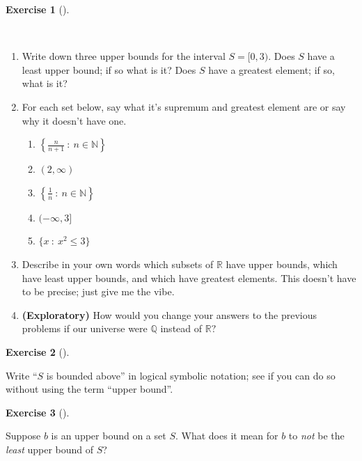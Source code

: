 \documentclass[
  letterpaper,
  DIV=11,
  numbers=noendperiod]{scrreprt}
\providecommand{\tightlist}{%
  \setlength{\itemsep}{0pt}\setlength{\parskip}{0pt}}
\def\R{\mathbb R}
\def\N{\mathbb N}
\def\Q{\mathbb Q}
\newcommand{\st}{~:~}
\theoremstyle{plain}
\theoremstyle{definition}
\newtheorem{exercise}{Exercise}[chapter]
\theoremstyle{plain}
\theoremstyle{plain}
\theoremstyle{definition}
\theoremstyle{definition}
\theoremstyle{remark}
\begin{document}
\begin{exercise}[]\protect\hypertarget{exr-lub-examples}{}\label{exr-lub-examples}

~

\begin{enumerate}
\def\labelenumi{\arabic{enumi}.}
\tightlist
\item
  Write down three upper bounds for the interval \(S=[0,3)\). Does \(S\)
  have a least upper bound; if so what is it? Does \(S\) have a greatest
  element; if so, what is it?
\item
  For each set below, say what it's supremum and greatest element are or
  say why it doesn't have one.

  \begin{enumerate}
  \def\labelenumii{\alph{enumii}.}
  \tightlist
  \item
    \(\left\{\frac{n}{n+1}\st n\in\N\right\}\)
  \item
    \((2,\infty)\)
  \item
    \(\left\{\frac{1}{n}\st n\in\N\right\}\)
  \item
    \((-\infty,3]\)
  \item
    \(\{x\st x^2\leq 3\}\)
  \end{enumerate}
\item
  Describe in your own words which subsets of \(\R\) have upper bounds,
  which have least upper bounds, and which have greatest elements. This
  doesn't have to be precise; just give me the vibe.
\item
  \textbf{(Exploratory)} How would you change your answers to the
  previous problems if our universe were \(\Q\) instead of \(\R?\)
\end{enumerate}

\end{exercise}

\begin{exercise}[]\protect\hypertarget{exr-bounded-above-logical-symbols}{}\label{exr-bounded-above-logical-symbols}

Write ``\(S\) is bounded above'' in logical symbolic notation; see if
you can do so without using the term ``upper bound''.

\end{exercise}

\begin{exercise}[]\protect\hypertarget{exr-negate-lub}{}\label{exr-negate-lub}

Suppose \(b\) is an upper bound on a set \(S\). What does it mean for
\(b\) to \emph{not} be the \emph{least} upper bound of \(S\)?

\end{exercise}
\end{document}
